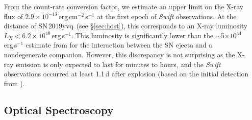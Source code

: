 \documentclass[twocolumn]{aastex63}
\newcommand{\sn}{SN\,2019yvq}
\begin{document}
From the count-rate conversion factor, we estimate an upper limit on the X-ray
flux of $2.9 \times 10^{-13}$\,erg\,cm$^{-2}$\,s$^{-1}$ at the first epoch of
\textit{Swift} observations. At the distance of \sn\ (see \S\ref{sec:host}),
this corresponds to an X-ray luminosity $L_X < 6.2 \times
10^{40}$\,erg\,s$^{-1}$. This luminosity is significantly lower than the
$\sim$5$\times 10^{44}$\,erg\,s$^{-1}$ estimate from \citet{Kasen10a} for the
interaction between the SN ejecta and a nondegenerate companion. However, this
discrepancy is not surprising as the X-ray emission is only expected to last
for minutes to hours, and the \textit{Swift} observations occurred at least
1.1\,d after explosion (based on the initial detection from
\citealt{Itagaki19}).

% 
%
%

\subsection{Optical Spectroscopy}
\end{document}

